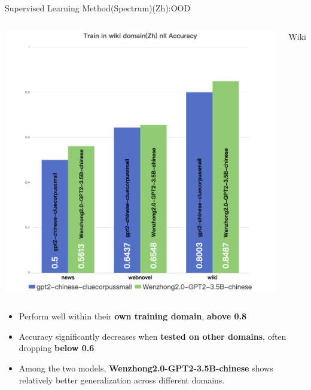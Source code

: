 \documentclass[serif]{beamer}
\begin{document}
\begin{frame}{Supervised Learning Method(Spectrum)(Zh):OOD}
\begin{columns}[t]
    \centering
    \includegraphics[width=\linewidth]{images/Train in wiki domain(Zh) nll Accuracy.png}
    \caption*{Wiki}
\end{columns}
\begin{itemize}
    \item Perform well within their \textbf{own training domain}, \textbf{above 0.8}
    \item Accuracy significantly decreases when \textbf{tested on other domains}, often dropping \textbf{below 0.6}
    \item Among the two models, \textbf{Wenzhong2.0-GPT2-3.5B-chinese} shows relatively better generalization across different domains.
    
\end{itemize}
\end{frame}
\end{document}
